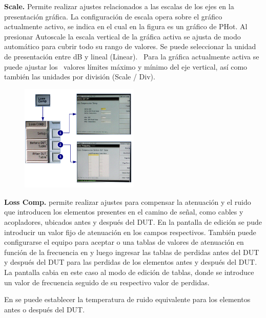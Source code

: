 {\begin{minipage}[t][11cm]{\textwidth}
		\textbf{Scale.} Permite realizar ajustes relacionados a las escalas de los ejes en la presentación gráfica. La configuración de escala opera sobre el gráfico actualmente activo, se indica en el cual en la figura es un gráfico de PHot. Al presionar Autoscale la escala vertical de la gráfica activa se ajusta de modo automático para cubrir todo su rango de valores. Se puede seleccionar la unidad de presentación entre dB y lineal (Linear). \ Para la gráfica actualmente activa se puede ajustar los \ valores límites máximo y mínimo del eje vertical, así como también las unidades por división (Scale /
		Div).	
	\end{minipage}

	\begin{minipage}[t]{\textwidth}
		\begin{figure}	
			\centering	
			\includegraphics[width=0.5\textwidth]{Imagenes/MenuLossCompN8975A.pdf}	
		\end{figure}
		
		\textbf{Loss Comp.} permite realizar ajustes para compensar la atenuación y el ruido que	introducen los elementos presentes en el camino de señal, como cables y acopladores, ubicados antes y después del DUT. En la pantalla de edición se pude introducir un valor fijo de atenuación en los campos respectivos. También puede configurarse el equipo para aceptar o una tablas de valores de atenuación en función de la frecuencia en y luego ingresar las tablas de perdidas antes del DUT y después del DUT para las perdidas de los elementos antes y después del DUT. La pantalla cabia en este caso al modo de edición de tablas, donde se introduce un valor de frecuencia seguido de	su respectivo valor de perdidas.
		
		En se puede establecer la temperatura de ruido equivalente para los elementos antes o después del DUT. 
	\end{minipage}
	
}
